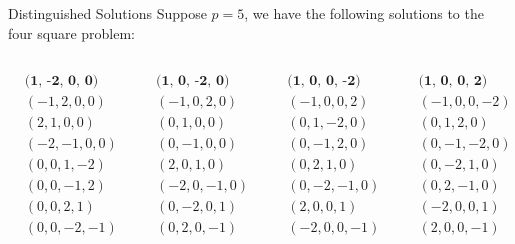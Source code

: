 \documentclass[10pt]{beamer}
\theoremstyle{definition}\newtheorem{proposition}{Proposition}
\begin{document}
\begin{frame}{Distinguished Solutions}
Suppose $p = 5$, we have the following solutions to the four square problem:
\scriptsize
\begin{columns}
\centering
\begin{column}{0.13\textwidth}
\begin{align*}
&\textbf{(1, -2, 0, 0)}\\
&(-1, 2, 0, 0)\\
&(2, 1, 0, 0)\\
&(-2, -1, 0, 0)\\
&(0, 0, 1, -2)\\
&(0, 0, -1, 2)\\
&(0, 0, 2, 1)\\
&(0, 0, -2, -1)
\end{align*}
\end{column}

\begin{column}{0.10\textwidth}
\begin{align*}
&\textbf{(1, 0, -2, 0)}\\
&(-1, 0, 2, 0)\\
&(0, 1, 0, 0)\\
&(0, -1, 0, 0)\\
&(2, 0, 1, 0)\\
&(-2, 0, -1, 0)\\
&(0, -2, 0, 1)\\
&(0, 2, 0, -1)
\end{align*}
\end{column}

\begin{column}{0.10\textwidth}
\begin{align*}
&\textbf{(1, 0, 0, -2)}\\
&(-1, 0, 0, 2)\\
&(0, 1, -2, 0)\\
&(0, -1, 2, 0)\\
&(0, 2, 1, 0)\\
&(0, -2, -1, 0)\\
&(2, 0, 0, 1)\\
&(-2, 0, 0, -1)
\end{align*}
\end{column}

\begin{column}{0.10\textwidth}
\begin{align*}
&\textbf{(1, 0, 0, 2)}\\
&(-1, 0, 0, -2)\\
&(0, 1, 2, 0)\\
&(0, -1, -2, 0)\\
&(0, -2, 1, 0)\\
&(0, 2, -1, 0)\\
&(-2, 0, 0, 1)\\
&(2, 0, 0, -1)
\end{align*}
\end{column}


\end{columns}
\end{frame}
\end{document}
